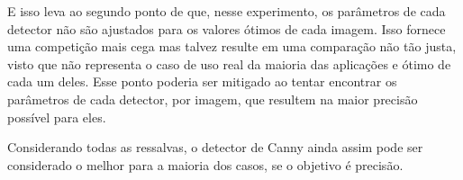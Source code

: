 \documentclass[10pt,twocolumn,letterpaper]{article}
\begin{document}
E isso leva ao segundo ponto de que, nesse experimento, os parâmetros de cada detector não são ajustados para os valores ótimos de cada imagem. Isso fornece uma competição mais cega mas talvez resulte em uma comparação não tão justa, visto que não representa o caso de uso real da maioria das aplicações e ótimo de cada um deles. Esse ponto poderia ser mitigado ao tentar encontrar os parâmetros de cada detector, por imagem, que resultem na maior precisão possível para eles.

Considerando todas as ressalvas, o detector de Canny ainda assim pode ser considerado o melhor para a maioria dos casos, se o objetivo é precisão.

{\small


}
\end{document}

